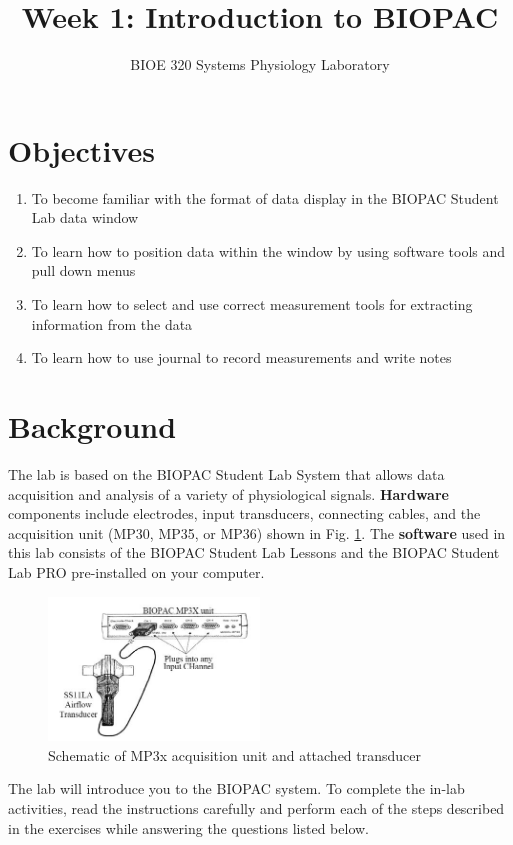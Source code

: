 \documentclass{article}
\title{Week 1: Introduction to BIOPAC}
\author{BIOE 320 Systems Physiology Laboratory}
\date{}
\begin{document}
\large
\maketitle

\section*{Objectives}
\begin{enumerate}
	\item To become familiar with the format of data display in the BIOPAC Student Lab data window
	\item To learn how to position data within the window by using software tools and pull down menus
	\item To learn how to select and use correct measurement tools for extracting information from the data
	\item To learn how to use journal to record measurements and write notes
\end{enumerate}

\section*{Background}
The lab is based on the BIOPAC Student Lab System that allows data acquisition and analysis of a variety of physiological signals. \textbf{Hardware} components include electrodes, input transducers, connecting cables, and the acquisition unit (MP30, MP35, or MP36) shown in Fig. \ref{basic_scheme}. The \textbf{software} used in this lab consists of the BIOPAC Student Lab Lessons and the BIOPAC Student Lab PRO pre-installed on your computer.

\begin{figure}[h]
\includegraphics[width=0.5\textwidth]{../images/BIOPAC_1.jpg}
\centering
\caption{Schematic of MP3x acquisition unit and attached transducer}
\label{basic_scheme}
\end{figure}

The lab will introduce you to the BIOPAC system. To complete the in-lab activities, read the instructions carefully and perform each of the steps described in the exercises while answering the questions listed below. 
\end{document}
